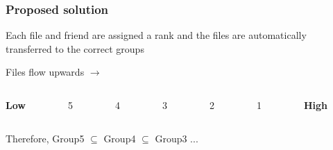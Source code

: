 \documentclass{beamer}
\begin{document}
  \begin{frame}
    \frametitle{Proposed solution}
    Each file and friend are assigned a rank and the files are automatically transferred to the correct groups \\
    \vspace*{0.5cm}
   \begin{center}
    Files flow upwards $\boldsymbol{\longrightarrow}$
    \vspace*{-1cm}
   \end{center}
    \begin{columns}
    \begin{column}[T]{1cm}
     \begin{center}
      \textbf{Low} 
     \end{center} 
     \end{column}
     
     \begin{column}[T]{1cm}
     \begin{center}
      5
     \end{center} 
     \end{column}

     \begin{column}[T]{1cm}
     \begin{center}
     4
     \end{center} 
     \end{column}
     
     \begin{column}[T]{1cm}
     \begin{center}
      3
     \end{center} 
     \end{column}
     
     \begin{column}[T]{1cm}
     \begin{center}
      2
     \end{center} 
     \end{column}
     
     \begin{column}[T]{1cm}
     \begin{center}
      1
     \end{center} 
     \end{column}
     
     \begin{column}[T]{1cm}
     \begin{center}
      \textbf{High}
     \end{center} 
     \end{column}
    \end{columns}
    \vspace*{1.5cm}
    Therefore, Group5 $\subseteq$ Group4 $\subseteq$ Group3 ...
  \end{frame}
\end{document}
